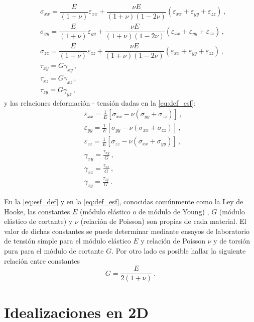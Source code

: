 \documentclass[../notas medios.tex]{subfiles}
\begin{document}
\begin{equation} \label{eq:esf_def}
\begin{split}
& \sigma_{xx} = \dfrac{E}{(1 + \nu)} \varepsilon_{xx} + \dfrac{\nu E}{(1 + 
\nu)(1-2 \nu)} (\varepsilon_{xx} + \varepsilon_{yy} + \varepsilon_{zz})\, , \\
& \sigma_{yy} =\dfrac{E}{(1 + \nu)} \varepsilon_{yy} + \dfrac{\nu E}{(1 + 
\nu)(1-2 \nu)} (\varepsilon_{xx} + \varepsilon_{yy} + \varepsilon_{zz})\, , \\
& \sigma _{zz} = \dfrac{E}{(1 + \nu)} \varepsilon_{zz} + \dfrac{\nu E}{(1 + 
\nu)(1-2 \nu)} (\varepsilon_{xx} + \varepsilon_{yy} + \varepsilon_{zz})\, , \\
& \tau_{xy} = G \gamma_{xy}\, ,  \\
& \tau_{xz} = G \gamma_{xz}\, ,  \\
& \tau_{zy} = G \gamma_{yz}\, ,
\end{split}
\end{equation}
y  las relaciones deformación - tensión dadas en la \cref{eq:def_esf}:
\begin{equation} \label{eq:def_esf}
\begin{split}
& \varepsilon_{xx} = \frac{1}{E}\left[ \sigma_{xx} - \nu (\sigma_{yy} + 
\sigma_{zz})\right]\, , \\
& \varepsilon_{yy} = \frac{1}{E}\left[ \sigma_{yy} - \nu (\sigma_{xx} + 
\sigma_{zz}) \right]\, , \\
& \varepsilon_{zz} = \frac{1}{E}\left[ \sigma_{zz} - \nu (\sigma_{xx} + 
\sigma_{yy}) \right]\, , \\
& \gamma_{xy} = \frac{\tau_{xy}}{G}\, , \\
& \gamma_{xz} = \frac{\tau_{xz}}{G}\, , \\
& \gamma_{zy} = \frac{\tau_{zy}}{G}\, .
\end{split}
\end{equation}

En la \cref{eq:esf_def} y en la \cref{eq:def_esf}, conocidas comúnmente como la 
Ley de Hooke, las constantes $E$ (módulo elástico o de módulo de Young) , $G$ 
(módulo elástico de cortante) y $\nu$ (relación de Poisson) son propias de cada 
material. El valor de dichas constantes se puede determinar mediante ensayos de 
laboratorio de tensión simple para el módulo elástico $E$ y relación de Poisson 
$\nu$ y de torsión pura para el módulo de cortante $G$. Por otro lado es 
posible hallar la siguiente relación entre constantes
\[G = \dfrac{E}{2(1 + \nu)}\, .\]

\section{Idealizaciones en 2D}
\end{document}

